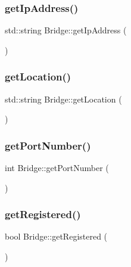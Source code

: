 \subsubsection{\texorpdfstring{get\+Ip\+Address()}{getIpAddress()}}
{\footnotesize\ttfamily std\+::string Bridge\+::get\+Ip\+Address (\begin{DoxyParamCaption}{ }\end{DoxyParamCaption})\hspace{0.3cm}{\ttfamily [inline]}}

\mbox{\label{class_bridge_a9c807b40340f2469ffad6a8e48bfee73}} 
\subsubsection{\texorpdfstring{get\+Location()}{getLocation()}}
{\footnotesize\ttfamily std\+::string Bridge\+::get\+Location (\begin{DoxyParamCaption}{ }\end{DoxyParamCaption})\hspace{0.3cm}{\ttfamily [inline]}}

\mbox{\label{class_bridge_ac2ec6b055bffee5f813b1f9b70ab086b}} 
\subsubsection{\texorpdfstring{get\+Port\+Number()}{getPortNumber()}}
{\footnotesize\ttfamily int Bridge\+::get\+Port\+Number (\begin{DoxyParamCaption}{ }\end{DoxyParamCaption})\hspace{0.3cm}{\ttfamily [inline]}}

\mbox{\label{class_bridge_a5286a8d45ce04a058c2e15730ee47b7b}} 
\subsubsection{\texorpdfstring{get\+Registered()}{getRegistered()}}
{\footnotesize\ttfamily bool Bridge\+::get\+Registered (\begin{DoxyParamCaption}{ }\end{DoxyParamCaption})\hspace{0.3cm}{\ttfamily [inline]}}

